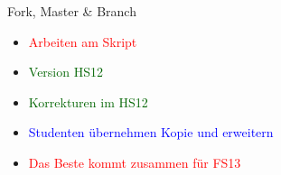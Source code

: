 \begin{frame}
\begin{columns}
\begin{column}{5cm}
\begin{block}{Fork, Master \& Branch}
                \begin{itemize}
                    \item \textcolor{red}{Arbeiten am Skript}
                    \item \textcolor{darkgreen}{Version HS12}
                    \item \textcolor{darkgreen}{Korrekturen im HS12}
                    \item \textcolor{blue}{Studenten übernehmen Kopie und erweitern}
                    \item \textcolor{red}{Das Beste kommt zusammen für FS13}
                \end{itemize}
            \end{block}
        \end{column}
    \end{columns}
\end{frame}

